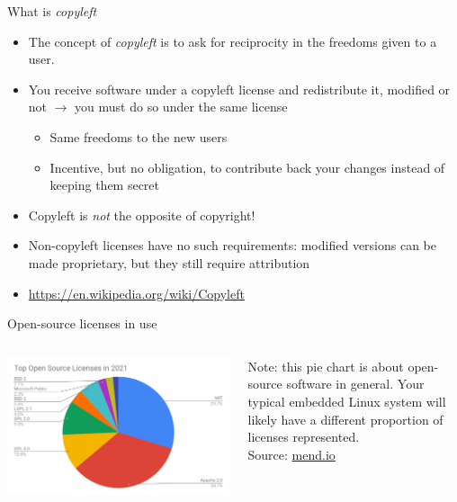 \begin{frame}{What is {\em copyleft}}
  \begin{itemize}
  \item The concept of {\em copyleft} is to ask for reciprocity in the
    freedoms given to a user.
  \item You receive software under a copyleft license and
    redistribute it, modified or not $\rightarrow$ you must do so
    under the same license
    \begin{itemize}
    \item Same freedoms to the new users
    \item Incentive, but no obligation, to contribute back your
      changes instead of keeping them secret
    \end{itemize}
  \item Copyleft is {\em not} the opposite of copyright!
  \item Non-copyleft licenses have no such requirements: modified
    versions can be made proprietary, but they still require
    attribution
  \item \url{https://en.wikipedia.org/wiki/Copyleft}
  \end{itemize}
\end{frame}

\begin{frame}{Open-source licenses in use}
  \begin{columns}
    \begin{center}
      \includegraphics[width=\textwidth]{slides/sysdev-licensing/open-source-licenses-share.png}
    \end{center}
    Note: this pie chart is about open-source software in
    general. Your typical embedded Linux system will likely have a
    different proportion of licenses represented.\\
    \vspace{0.5cm}
    Source: \href{https://www.mend.io/resources/blog/open-source-licenses-trends-and-predictions/}{mend.io}
  \end{columns}
\end{frame}

